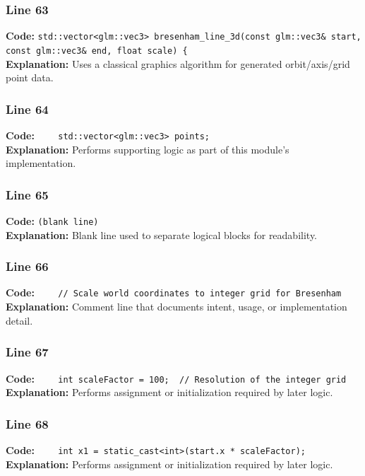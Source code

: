 \documentclass[11pt,a4paper]{article}
\begin{document}
\subsubsection*{Line 63}
\textbf{Code:} \verb|std::vector<glm::vec3> bresenham_line_3d(const glm::vec3& start, const glm::vec3& end, float scale) {|\\
\textbf{Explanation:} Uses a classical graphics algorithm for generated orbit/axis/grid point data.

\subsubsection*{Line 64}
\textbf{Code:} \verb|    std::vector<glm::vec3> points;|\\
\textbf{Explanation:} Performs supporting logic as part of this module's implementation.

\subsubsection*{Line 65}
\textbf{Code:} \texttt{(blank line)}\\
\textbf{Explanation:} Blank line used to separate logical blocks for readability.

\subsubsection*{Line 66}
\textbf{Code:} \verb|    // Scale world coordinates to integer grid for Bresenham|\\
\textbf{Explanation:} Comment line that documents intent, usage, or implementation detail.

\subsubsection*{Line 67}
\textbf{Code:} \verb|    int scaleFactor = 100;  // Resolution of the integer grid|\\
\textbf{Explanation:} Performs assignment or initialization required by later logic.

\subsubsection*{Line 68}
\textbf{Code:} \verb|    int x1 = static_cast<int>(start.x * scaleFactor);|\\
\textbf{Explanation:} Performs assignment or initialization required by later logic.
\end{document}

